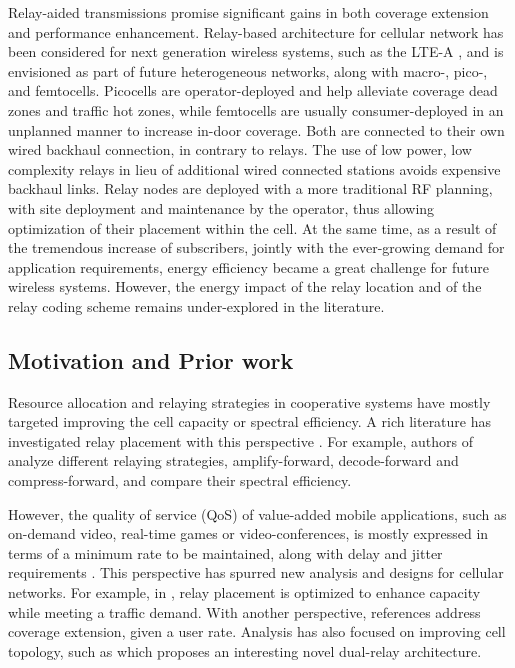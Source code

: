 \documentclass[journal]{IEEEtran}
\theoremstyle{definition}
\begin{document}
Relay-aided transmissions promise significant gains in both coverage extension and performance enhancement.  Relay-based architecture for cellular network has been considered for next generation wireless systems, such as the LTE-A \cite{ghosh2010, loa2010, damnjanovic2011}, 
and is envisioned as part of future heterogeneous networks, along with macro-, pico-, and femtocells. Picocells are operator-deployed and help alleviate coverage dead zones and traffic hot zones, while femtocells are usually consumer-deployed in an unplanned manner to increase in-door coverage. Both are connected to their own wired backhaul connection, in contrary to relays. The use of low power, low complexity relays in lieu of additional wired connected stations avoids expensive backhaul links.
Relay nodes are deployed with a more traditional RF planning, with site deployment and maintenance by the operator, thus allowing optimization of their placement within the cell.
At the same time, as a result of the tremendous increase of subscribers, jointly with the ever-growing demand for application requirements, energy efficiency became a great challenge for future wireless systems. However, the energy impact of the relay location and of the relay coding scheme remains under-explored in the literature.



\subsection{Motivation and Prior work}

Resource allocation and relaying strategies in cooperative systems have mostly targeted improving the cell capacity or spectral efficiency. A rich literature has investigated relay placement with this perspective \cite{lin2007, lichun2008, huang2010, lu2011, sambale2012}. For example, authors of \cite{lin2007} analyze different relaying strategies, amplify-forward, decode-forward and compress-forward, and compare their spectral efficiency.
 
However, the quality of service (QoS) of value-added mobile applications, such as on-demand video, real-time games or video-conferences, is mostly expressed in terms of a minimum rate to be maintained, along with delay and jitter requirements \cite{qos}.
This perspective has spurred new analysis and designs for cellular networks. For example, in \cite{lin2010}, relay placement is optimized to enhance capacity while meeting a traffic demand. With another perspective, references \cite{joshi2011, youssef2012, khakurel2012} address coverage extension, given a user rate. Analysis has also focused on improving cell topology, such as \cite{lin2008} which proposes an interesting novel dual-relay architecture. 
\end{document}
